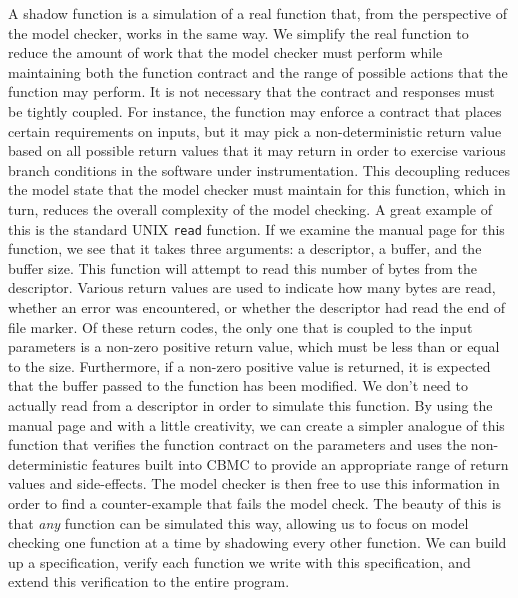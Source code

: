 A shadow function is a simulation of a real function that, from the perspective
of the model checker, works in the same way.  We simplify the real function to
reduce the amount of work that the model checker must perform while maintaining
both the function contract and the range of possible actions that the function
may perform.  It is not necessary that the contract and responses must be
tightly coupled.  For instance, the function may enforce a contract that
places certain requirements on inputs, but it may pick a non-deterministic
return value based on all possible return values that it may return in order to
exercise various branch conditions in the software under instrumentation.  This
decoupling reduces the model state that the model checker must maintain for this
function, which in turn, reduces the overall complexity of the model checking.
A great example of this is the standard UNIX \verb/read/ function.  If we
examine the manual page for this function, we see that it takes three arguments:
a descriptor, a buffer, and the buffer size.  This function will attempt to read
this number of bytes from the descriptor. Various return values are used to
indicate how many bytes are read, whether an error was encountered, or whether
the descriptor had read the end of file marker.  Of these return codes, the only
one that is coupled to the input parameters is a non-zero positive return value,
which must be less than or equal to the size.  Furthermore, if a non-zero
positive value is returned, it is expected that the buffer passed to the
function has been modified.  We don't need to actually read from a descriptor in
order to simulate this function.  By using the manual page and with a little
creativity, we can create a simpler analogue of this function that verifies
the function contract on the parameters and uses the non-deterministic features
built into CBMC to provide an appropriate range of return values and
side-effects.  The model checker is then free to use this information in order
to find a counter-example that fails the model check.  The beauty of this is
that \emph{any} function can be simulated this way, allowing us to focus on
model checking one function at a time by shadowing every other function.  We can
build up a specification, verify each function we write with this specification,
and extend this verification to the entire program.
